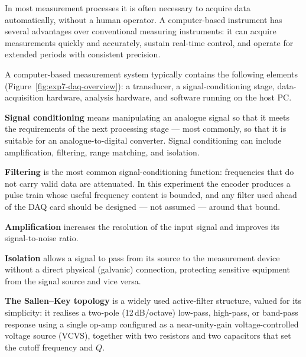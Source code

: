 \begin{introduction}
  In most measurement processes it is often necessary to acquire data automatically, without a human operator. A computer-based instrument has several advantages over conventional measuring instruments: it can acquire measurements quickly and accurately, sustain real-time control, and operate for extended periods with consistent precision.\vspace*{10pt}

  A computer-based measurement system typically contains the following elements (Figure~\ref{fig:exp7-daq-overview}): a transducer, a signal-conditioning stage, data-acquisition hardware, analysis hardware, and software running on the host PC.\newpage

  \textbf{Signal conditioning} means manipulating an analogue signal so that it meets the requirements of the next processing stage --- most commonly, so that it is suitable for an analogue-to-digital converter. Signal conditioning can include amplification, filtering, range matching, and isolation.\vspace*{10pt}

  \textbf{Filtering} is the most common signal-conditioning function: frequencies that do not carry valid data are attenuated. In this experiment the encoder produces a pulse train whose useful frequency content is bounded, and any filter used ahead of the DAQ card should be designed --- not assumed --- around that bound.\vspace*{10pt}

  \textbf{Amplification} increases the resolution of the input signal and improves its signal-to-noise ratio.\vspace*{10pt}

  \textbf{Isolation} allows a signal to pass from its source to the measurement device without a direct physical (galvanic) connection, protecting sensitive equipment from the signal source and vice versa.\vspace*{10pt}

  \textbf{The Sallen--Key topology} is a widely used active-filter structure, valued for its simplicity: it realises a two-pole (12\,dB/octave) low-pass, high-pass, or band-pass response using a single op-amp configured as a near-unity-gain voltage-controlled voltage source (VCVS), together with two resistors and two capacitors that set the cutoff frequency and $Q$.
\end{introduction}
\vspace*{1.5em}

